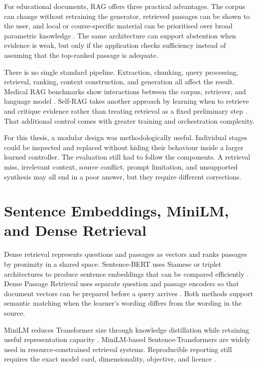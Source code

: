 For educational documents, RAG offers three practical advantages. The corpus can change without retraining the generator, retrieved passages can be shown to the user, and local or course-specific material can be prioritised over broad parametric knowledge \parencite{lewis2020}. The same architecture can support abstention when evidence is weak, but only if the application checks sufficiency instead of assuming that the top-ranked passage is adequate.

There is no single standard pipeline. Extraction, chunking, query processing, retrieval, ranking, context construction, and generation all affect the result. Medical RAG benchmarks show interactions between the corpus, retriever, and language model \parencite{xiong2024medrag}. Self-RAG takes another approach by learning when to retrieve and critique evidence rather than treating retrieval as a fixed preliminary step \parencite{asai2024selfrag}. That additional control comes with greater training and orchestration complexity.

For this thesis, a modular design was methodologically useful. Individual stages could be inspected and replaced without hiding their behaviour inside a larger learned controller. The evaluation still had to follow the components. A retrieval miss, irrelevant context, source conflict, prompt limitation, and unsupported synthesis may all end in a poor answer, but they require different corrections.

\section{Sentence Embeddings, MiniLM, and Dense Retrieval}
\label{sec:dense-retrieval-background}

Dense retrieval represents questions and passages as vectors and ranks passages by proximity in a shared space. Sentence-BERT uses Siamese or triplet architectures to produce sentence embeddings that can be compared efficiently \parencite{reimers2019}. Dense Passage Retrieval uses separate question and passage encoders so that document vectors can be prepared before a query arrives \parencite{karpukhin2020}. Both methods support semantic matching when the learner's wording differs from the wording in the source.

MiniLM reduces Transformer size through knowledge distillation while retaining useful representation capacity \parencite{wang2020}. MiniLM-based Sentence-Transformers are widely used in resource-constrained retrieval systems. Reproducible reporting still requires the exact model card, dimensionality, objective, and licence \parencite{minilmModelCard}.

